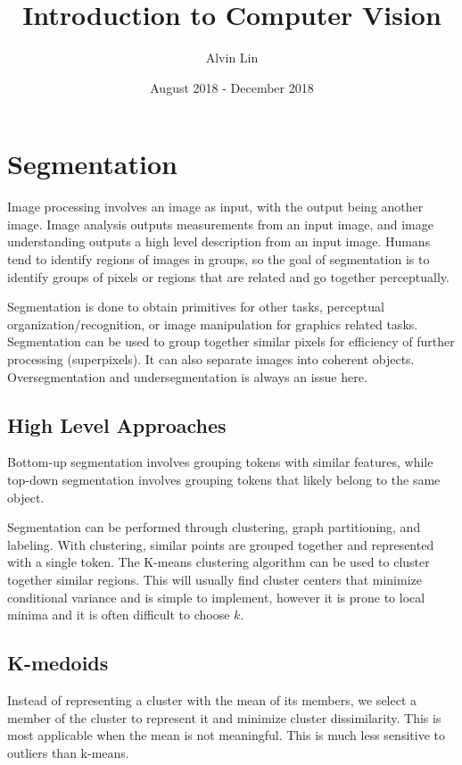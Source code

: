\documentclass{math}
\title{Introduction to Computer Vision}
\author{Alvin Lin}
\date{August 2018 - December 2018}
\begin{document}
\maketitle

\section*{Segmentation}
Image processing involves an image as input, with the output being another
image. Image analysis outputs measurements from an input image, and image
understanding outputs a high level description from an input image. Humans
tend to identify regions of images in groups, so the goal of segmentation is to
identify groups of pixels or regions that are related and go together
perceptually. \par
Segmentation is done to obtain primitives for other tasks, perceptual
organization/recognition, or image manipulation for graphics related tasks.
Segmentation can be used to group together similar pixels for efficiency of
further processing (superpixels). It can also separate images into coherent
objects. Oversegmentation and undersegmentation is always an issue here.

\subsection*{High Level Approaches}
Bottom-up segmentation involves grouping tokens with similar features, while
top-down segmentation involves grouping tokens that likely belong to the same
object. \par
Segmentation can be performed through clustering, graph partitioning, and
labeling. With clustering, similar points are grouped together and represented
with a single token. The K-means clustering algorithm can be used to cluster
together similar regions. This will usually find cluster centers that
minimize conditional variance and is simple to implement, however it is prone
to local minima and it is often difficult to choose \( k \).

\subsection*{K-medoids}
Instead of representing a cluster with the mean of its members, we select a
member of the cluster to represent it and minimize cluster dissimilarity. This
is most applicable when the mean is not meaningful. This is much less sensitive
to outliers than k-means.
\end{document}
